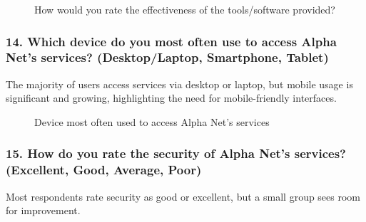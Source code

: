 \begin{figure}[H]
    \centering
    \caption{How would you rate the effectiveness of the tools/software provided?}
    \label{fig:tools_effectiveness}
\end{figure}

\subsubsection*{14. Which device do you most often use to access Alpha Net's services? (Desktop/Laptop, Smartphone, Tablet)}

The majority of users access services via desktop or laptop, but mobile usage is significant and growing, highlighting the need for mobile-friendly interfaces.

\begin{figure}[H]
    \centering
    \caption{Device most often used to access Alpha Net's services}
    \label{fig:device_usage}
\end{figure}

\subsubsection*{15. How do you rate the security of Alpha Net's services? (Excellent, Good, Average, Poor)}

Most respondents rate security as good or excellent, but a small group sees room for improvement.

